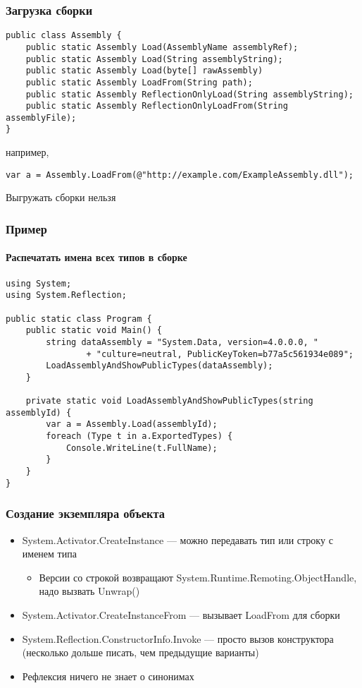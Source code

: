 \documentclass[xetex,mathserif,serif]{beamer}
\begin{document}
	\begin{frame}[fragile]
		\frametitle{Загрузка сборки}
		\begin{small}
			\begin{verbatim}
public class Assembly {
    public static Assembly Load(AssemblyName assemblyRef);
    public static Assembly Load(String assemblyString);
    public static Assembly Load(byte[] rawAssembly)
    public static Assembly LoadFrom(String path);
    public static Assembly ReflectionOnlyLoad(String assemblyString);
    public static Assembly ReflectionOnlyLoadFrom(String assemblyFile);
}
			\end{verbatim}
			например,
			\begin{verbatim}
var a = Assembly.LoadFrom(@"http://example.com/ExampleAssembly.dll");
			\end{verbatim}
			Выгружать сборки нельзя
		\end{small}
	\end{frame}

	\begin{frame}[fragile]
		\frametitle{Пример}
		\framesubtitle{Распечатать имена всех типов в сборке}
		\begin{footnotesize}
			\begin{verbatim}
using System;
using System.Reflection;

public static class Program {
    public static void Main() {
        string dataAssembly = "System.Data, version=4.0.0.0, "
                + "culture=neutral, PublicKeyToken=b77a5c561934e089";
        LoadAssemblyAndShowPublicTypes(dataAssembly);
    }

    private static void LoadAssemblyAndShowPublicTypes(string assemblyId) {
        var a = Assembly.Load(assemblyId);
        foreach (Type t in a.ExportedTypes) {
            Console.WriteLine(t.FullName);
        }
    }
}
			\end{verbatim}
		\end{footnotesize}
	\end{frame}

	\begin{frame}
		\frametitle{Создание экземпляра объекта}
		\begin{itemize}
			\item System.Activator.CreateInstance --- можно передавать тип или строку с именем типа
			\begin{itemize}
				\item Версии со строкой возвращают System.Runtime.Remoting.ObjectHandle, надо вызвать Unwrap()
			\end{itemize}
			\item System.Activator.CreateInstanceFrom --- вызывает LoadFrom для сборки
			\item System.Reflection.ConstructorInfo.Invoke --- просто вызов конструктора (несколько дольше писать, чем предыдущие варианты)
			\item Рефлексия ничего не знает о синонимах
		\end{itemize}
	\end{frame}
\end{document}
